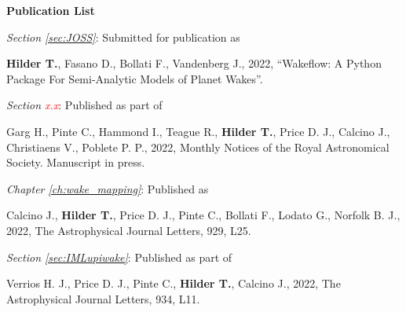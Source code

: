\thispagestyle{plain}


\begin{center}
    
    {\Large \textbf{Publication List}}
    
\end{center}

\setlength{\parindent}{0pt}

\textit{Section \ref{sec:JOSS}}:  Submitted for publication as

\begin{myquote}{62pt}
    \textbf{Hilder T.}, Fasano D., Bollati F., Vandenberg J., 2022, ``Wakeflow: A Python Package For Semi-Analytic Models of Planet Wakes''.
\end{myquote}

\textit{Section {\textcolor{red}{x.x}}}:  Published as part of

\begin{myquote}{62pt}
    Garg H., Pinte C., Hammond I., Teague R., \textbf{Hilder T.}, Price D. J., Calcino J., Christiaens V., Poblete P. P., 2022, Monthly Notices of the Royal Astronomical Society. Manuscript in press.
\end{myquote}

\textit{Chapter \ref{ch:wake_mapping}}: \hspace{1pt} Published as

\begin{myquote}{62pt}
    Calcino J., \textbf{Hilder T.}, Price D. J., Pinte C., Bollati F., Lodato G., Norfolk B. J., 2022, The Astrophysical Journal Letters, 929, L25.
\end{myquote}

\textit{Section \ref{sec:IMLupiwake}}:  Published as part of

\begin{myquote}{62pt}
    Verrios H. J., Price D. J., Pinte C., \textbf{Hilder T.}, Calcino J., 2022, The Astrophysical Journal Letters, 934, L11.
\end{myquote}

\setlength{\parindent}{15pt}
\newpage